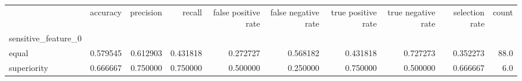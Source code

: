 \begin{tabular}{lrrrrrrrrr}
\toprule
{} &  accuracy &  precision &    recall &  false positive rate &  false negative rate &  true positive rate &  true negative rate &  selection rate &  count \\
sensitive\_feature\_0 &           &            &           &                      &                      &                     &                     &                 &        \\
\midrule
equal               &  0.579545 &   0.612903 &  0.431818 &             0.272727 &             0.568182 &            0.431818 &            0.727273 &        0.352273 &   88.0 \\
superiority         &  0.666667 &   0.750000 &  0.750000 &             0.500000 &             0.250000 &            0.750000 &            0.500000 &        0.666667 &    6.0 \\
\bottomrule
\end{tabular}

